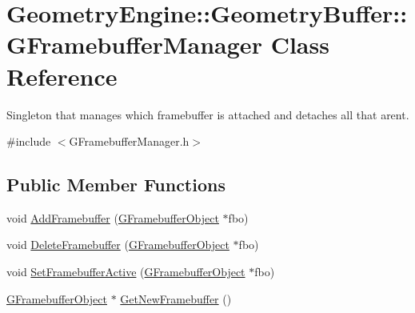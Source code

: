 \hypertarget{class_geometry_engine_1_1_geometry_buffer_1_1_g_framebuffer_manager}{}\section{Geometry\+Engine\+::Geometry\+Buffer\+::G\+Framebuffer\+Manager Class Reference}
\label{class_geometry_engine_1_1_geometry_buffer_1_1_g_framebuffer_manager}


Singleton that manages which framebuffer is attached and detaches all that aren\textquotesingle{}t.  




{\ttfamily \#include $<$G\+Framebuffer\+Manager.\+h$>$}

\subsection*{Public Member Functions}
\begin{DoxyCompactItemize}
\item 
void \mbox{\hyperlink{class_geometry_engine_1_1_geometry_buffer_1_1_g_framebuffer_manager_ab4d7a248ecc5cb9849add9961a693ecb}{Add\+Framebuffer}} (\mbox{\hyperlink{class_geometry_engine_1_1_geometry_buffer_1_1_g_framebuffer_object}{G\+Framebuffer\+Object}} $\ast$fbo)
\item 
void \mbox{\hyperlink{class_geometry_engine_1_1_geometry_buffer_1_1_g_framebuffer_manager_a53ef67132cb5556dc5fd60d01c3a6b9e}{Delete\+Framebuffer}} (\mbox{\hyperlink{class_geometry_engine_1_1_geometry_buffer_1_1_g_framebuffer_object}{G\+Framebuffer\+Object}} $\ast$fbo)
\item 
void \mbox{\hyperlink{class_geometry_engine_1_1_geometry_buffer_1_1_g_framebuffer_manager_a8f42a16dacecdc9422b88c71cfb38889}{Set\+Framebuffer\+Active}} (\mbox{\hyperlink{class_geometry_engine_1_1_geometry_buffer_1_1_g_framebuffer_object}{G\+Framebuffer\+Object}} $\ast$fbo)
\item 
\mbox{\hyperlink{class_geometry_engine_1_1_geometry_buffer_1_1_g_framebuffer_object}{G\+Framebuffer\+Object}} $\ast$ \mbox{\hyperlink{class_geometry_engine_1_1_geometry_buffer_1_1_g_framebuffer_manager_a4409dc69749e27c6864b25a76b1bcec9}{Get\+New\+Framebuffer}} ()
\end{DoxyCompactItemize}
